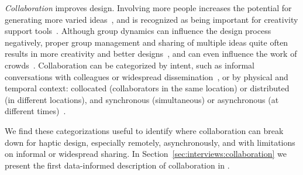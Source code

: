 \textit{Collaboration} improves design.
Involving more people increases the potential for generating more varied ideas~\citep{Warr2005}, and is recognized as being important for creativity support tools~\citep{Resnick2008,Shneiderman2000}.
Although group dynamics can influence the design process negatively, proper group management and sharing of multiple ideas quite often results in more creativity and better designs~\citep{Herring2009}, and can even influence the work of crowds~\citep{Dow2012a}.
Collaboration can be categorized by intent, such as informal conversations with colleagues or widespread dissemination~\citep{Shneiderman2000}, or by physical and temporal context: collocated (collaborators in the same location) or distributed (in different locations), and synchronous (simultaneous) or asynchronous (at different times)~\citep{Ellis1991}.

We find these categorizations useful to identify where collaboration can break down for haptic design, especially remotely, asynchronously, and with limitations on informal or widespread sharing.
In Section~\ref{sec:interviews:collaboration} we present the first data-informed description of collaboration in \haxd. %







